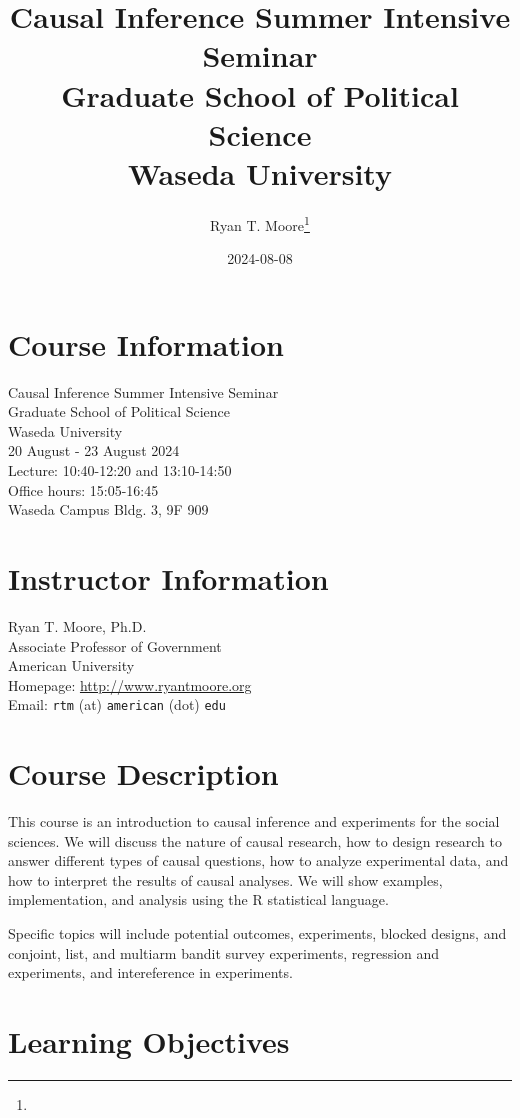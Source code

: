 \documentclass[11pt]{article}
\title{Causal Inference Summer Intensive Seminar \\ Graduate School of Political Science \\ Waseda University }
\author{Ryan T. Moore\footnote{\rtmaddr}}
\date{2024-08-08}
\newcommand{\firstdate}{20 }
\newcommand{\thisyear}{2024}
\begin{document}
\maketitle

\section*{Course Information}
Causal Inference Summer Intensive Seminar \\ Graduate School of Political Science \\ Waseda University \\
\firstdate August - 23 August \thisyear\\
Lecture: 10:40-12:20 and 13:10-14:50 \\
Office hours: 15:05-16:45  \\
Waseda Campus Bldg. 3, 9F 909

\section*{Instructor Information}
Ryan T. Moore, Ph.D. \\
Associate Professor of Government\\
American University\\
Homepage: \url{http://www.ryantmoore.org} \\
Email: {\tt rtm} (at) {\tt american} (dot) {\tt edu} 

\vspace{.1in}

\section*{Course Description}

This course is an introduction to causal inference and experiments for the social sciences. We will discuss the nature of causal research, how to design research to answer different types of causal questions, how to analyze experimental data, and how to interpret the results of causal analyses. We will show examples, implementation, and analysis using the R statistical language.

Specific topics will include potential outcomes, experiments, blocked designs, and conjoint, list, and multiarm bandit survey experiments, regression and experiments, and intereference in experiments.

\section*{Learning Objectives}
\end{document}
